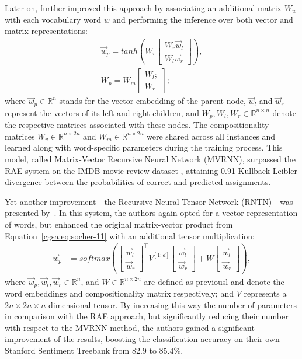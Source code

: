 Later on, \citet{Socher:12} further improved this approach by
associating an additional matrix $W_w$ with each vocabulary word $w$
and performing the inference over both vector and matrix
representations:
\begin{align*}
  \vec{w}_p = tanh\left(W_v \begin{bmatrix}W_r\vec{w}_l\\
      W_l \vec{w}_r\end{bmatrix} \right),\\
  W_p = W_m \begin{bmatrix}W_l;\\
    W_r\end{bmatrix};
\end{align*}
where $\vec{w}_p\in\mathbb{R}^n$ stands for the vector embedding of
the parent node, $\vec{w}_l$ and $\vec{w}_r$ represent the vectors of
its left and right children, and
$W_p, W_l, W_r \in \mathbb{R}^{n\times n}$ denote the respective
matrices associated with these nodes.  The compositionality matrices
$W_v\in\mathbb{R}^{n\times 2n}$ and $W_m\in\mathbb{R}^{n\times 2n}$
were shared across all instances and learned along with word-specific
parameters during the training process.  This model, called
Matrix-Vector Recursive Neural Network (MVRNN), surpassed the RAE
system on the IMDB movie review dataset \cite{Pang:05}, attaining 0.91
Kullback-Leibler divergence between the probabilities of correct and
predicted assignments.

Yet another improvement---the Recursive Neural Tensor Network
(RNTN)---was presented by~\citet{Socher:13}.  In this system, the
authors again opted for a vector representation of words, but enhanced
the original matrix-vector product from
Equation~\ref{cgsa:eq:socher-11} with an additional tensor
multiplication:
\begin{align*}
  \vec{w}_p &= softmax\left(\begin{bmatrix}
  \vec{w}_l\\
  \vec{w}_r
  \end{bmatrix}^{\top}V^{[1:d]}\begin{bmatrix}
  \vec{w}_l\\
  \vec{w}_r
  \end{bmatrix}
            + W\begin{bmatrix}
  \vec{w}_l\\
  \vec{w}_r
\end{bmatrix}\right),\label{cgsa:eq:socher-11}
\end{align*}
where $\vec{w}_p, \vec{w}_l, \vec{w}_r\in\mathbb{R}^n$, and
$W\in\mathbb{R}^{n\times 2n}$ are defined as previousl and denote the
word embeddings and compositionality matrix respectively; and $V$
represents a $2n\times 2n\times n$-dimensional tensor.  By increasing
this way the number of parameters in comparison with the RAE approach,
but significantly reducing their number with respect to the MVRNN
method, the authors gained a significant improvement of the results,
boosting the classification accuracy on their own Stanford Sentiment
Treebank from 82.9 to 85.4\%.

